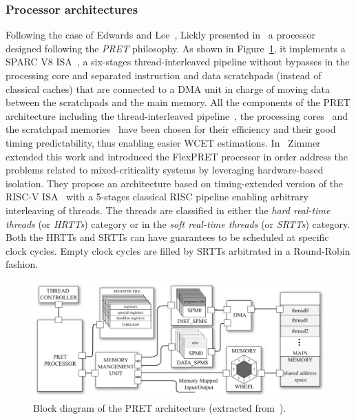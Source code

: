 \documentclass[main.tex]{subfiles}
\begin{document}
\subsubsection{Processor architectures}
Following the case of Edwards and Lee~\cite{Edwards2007}, Lickly \etal presented in~\cite{Lickly2008} a processor designed following the \emph{PRET} philosophy. As shown in Figure~\ref{fig_stateOfTheArt_PRETarchi}, it implements a SPARC V8 ISA~\cite{SparcV8}, a six-stages thread-interleaved pipeline without bypasses in the processing core and separated instruction and data scratchpads (instead of classical caches) that are connected to a DMA unit in charge of moving data between the scratchpads and the main memory. All the components of the PRET architecture including the thread-interleaved pipeline~\cite{Fort2006, Labrecque2007}, the processing cores~\cite{Ip2006} and the scratchpad memories~\cite{Benini2000} have been chosen for their efficiency and their good timing predictability, thus enabling easier WCET estimations. In~\cite{Zimmer2014} Zimmer \etal extended this work and introduced the FlexPRET processor in order address the problems related to mixed-criticality systems by leveraging hardware-based isolation. They propose an architecture based on timing-extended version of the RISC-V ISA~\cite{RISCV} with a 5-stages classical RISC pipeline enabling arbitrary interleaving of threads. The threads are classified in either the \emph{hard real-time threads} (or \emph{HRTTs}) category or in the \emph{soft real-time threads} (or \emph{SRTTs}) category. Both the HRTTs and SRTTs can have guarantees to be scheduled at specific clock cycles. Empty clock cycles are filled by SRTTs arbitrated in a Round-Robin fashion. \\

\begin{figure}
    \centering
    \includegraphics[width=15cm]{imgs/png/stateOfTheArt_PRETarchi.png}
    \caption{Block diagram of the PRET architecture (extracted from~\cite{Lickly2008}).}
    \label{fig_stateOfTheArt_PRETarchi}
\end{figure}
\end{document}
